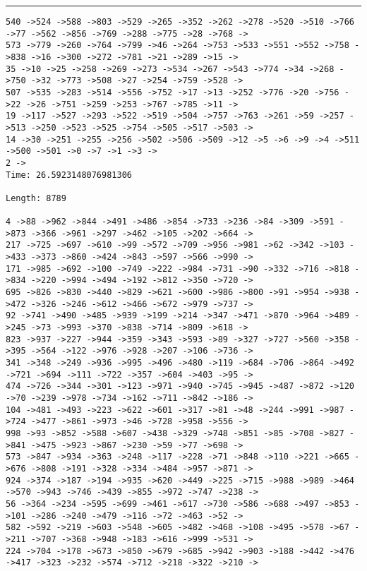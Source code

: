 \documentclass[letter, 12pt]{article}
\newenvironment{question}[1]{%
    \vspace{.2in}%
        \noindent{\bf #1}%
    \vspace{0.3em} \hrule \vspace{.1in}%
}{}
\begin{document}
\begin{question}{\large Appendix}
\begin{lstlisting}[style=CStyle]
540 ->524 ->588 ->803 ->529 ->265 ->352 ->262 ->278 ->520 ->510 ->766 ->77 ->562 ->856 ->769 ->288 ->775 ->28 ->768 ->
573 ->779 ->260 ->764 ->799 ->46 ->264 ->753 ->533 ->551 ->552 ->758 ->838 ->16 ->300 ->272 ->781 ->21 ->289 ->15 ->
35 ->10 ->25 ->258 ->269 ->273 ->534 ->267 ->543 ->774 ->34 ->268 ->750 ->32 ->773 ->508 ->27 ->254 ->759 ->528 ->
507 ->535 ->283 ->514 ->556 ->752 ->17 ->13 ->252 ->776 ->20 ->756 ->22 ->26 ->751 ->259 ->253 ->767 ->785 ->11 ->
19 ->117 ->527 ->293 ->522 ->519 ->504 ->757 ->763 ->261 ->59 ->257 ->513 ->250 ->523 ->525 ->754 ->505 ->517 ->503 ->
14 ->30 ->251 ->255 ->256 ->502 ->506 ->509 ->12 ->5 ->6 ->9 ->4 ->511 ->500 ->501 ->0 ->7 ->1 ->3 ->
2 ->
Time: 26.5923148076981306

Length: 8789

4 ->88 ->962 ->844 ->491 ->486 ->854 ->733 ->236 ->84 ->309 ->591 ->873 ->366 ->961 ->297 ->462 ->105 ->202 ->664 ->
217 ->725 ->697 ->610 ->99 ->572 ->709 ->956 ->981 ->62 ->342 ->103 ->433 ->373 ->860 ->424 ->843 ->597 ->566 ->990 ->
171 ->985 ->692 ->100 ->749 ->222 ->984 ->731 ->90 ->332 ->716 ->818 ->834 ->220 ->994 ->494 ->192 ->812 ->350 ->720 ->
695 ->826 ->830 ->440 ->829 ->621 ->600 ->986 ->800 ->91 ->954 ->938 ->472 ->326 ->246 ->612 ->466 ->672 ->979 ->737 ->
92 ->741 ->490 ->485 ->939 ->199 ->214 ->347 ->471 ->870 ->964 ->489 ->245 ->73 ->993 ->370 ->838 ->714 ->809 ->618 ->
823 ->937 ->227 ->944 ->359 ->343 ->593 ->89 ->327 ->727 ->560 ->358 ->395 ->564 ->122 ->976 ->928 ->207 ->106 ->736 ->
341 ->348 ->249 ->936 ->995 ->496 ->480 ->119 ->684 ->706 ->864 ->492 ->721 ->694 ->111 ->722 ->357 ->604 ->403 ->95 ->
474 ->726 ->344 ->301 ->123 ->971 ->940 ->745 ->945 ->487 ->872 ->120 ->70 ->239 ->978 ->734 ->162 ->711 ->842 ->186 ->
104 ->481 ->493 ->223 ->622 ->601 ->317 ->81 ->48 ->244 ->991 ->987 ->724 ->477 ->861 ->973 ->46 ->728 ->958 ->556 ->
998 ->93 ->852 ->588 ->607 ->438 ->329 ->748 ->851 ->85 ->708 ->827 ->841 ->475 ->923 ->867 ->230 ->59 ->77 ->698 ->
573 ->847 ->934 ->363 ->248 ->117 ->228 ->71 ->848 ->110 ->221 ->665 ->676 ->808 ->191 ->328 ->334 ->484 ->957 ->871 ->
924 ->374 ->187 ->194 ->935 ->620 ->449 ->225 ->715 ->988 ->989 ->464 ->570 ->943 ->746 ->439 ->855 ->972 ->747 ->238 ->
56 ->364 ->234 ->595 ->699 ->461 ->617 ->730 ->586 ->688 ->497 ->853 ->101 ->286 ->240 ->479 ->116 ->72 ->463 ->52 ->
582 ->592 ->219 ->603 ->548 ->605 ->482 ->468 ->108 ->495 ->578 ->67 ->211 ->707 ->368 ->948 ->183 ->616 ->999 ->531 ->
224 ->704 ->178 ->673 ->850 ->679 ->685 ->942 ->903 ->188 ->442 ->476 ->417 ->323 ->232 ->574 ->712 ->218 ->322 ->210 ->

\end{lstlisting}
\end{question}
\end{document}

